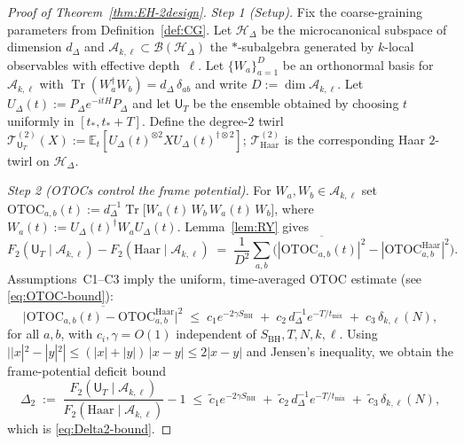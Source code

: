 \documentclass[a4paper,11pt]{article}
\newcommand{\Tr}{\operatorname{Tr}}
\theoremstyle{plain}
\theoremstyle{definition}
\theoremstyle{remark}
\begin{document}
\begin{proof}[Proof of Theorem~\ref{thm:EH-2design}]
\emph{Step 1 (Setup).} Fix the coarse-graining parameters from Definition~\ref{def:CG}. Let $\mathcal{H}_\Delta$
be the microcanonical subspace of dimension $d_\Delta$ and $\mathscr{A}_{k,\ell}\subset\mathcal{B}(\mathcal{H}_\Delta)$ the
$*$-subalgebra generated by $k$-local observables with effective depth~$\ell$. Let $\{W_a\}_{a=1}^{D}$ be an orthonormal basis
for $\mathscr{A}_{k,\ell}$ with $\Tr(W_a^\dagger W_b)=d_\Delta\,\delta_{ab}$ and write $D:=\dim\mathscr{A}_{k,\ell}$.
Let $U_\Delta(t):=P_\Delta e^{-itH}P_\Delta$ and let $\mathsf{U}_T$ be the ensemble obtained by choosing $t$ uniformly
in $[t_\ast,t_\ast+T]$. Define the degree-$2$ twirl
$\mathcal{T}^{(2)}_{\mathsf{U}_T}(X):=\mathbb{E}_{t}\!\left[U_\Delta(t)^{\otimes2} X U_\Delta(t)^{\dagger\otimes2}\right]$;
$\mathcal{T}^{(2)}_{\mathrm{Haar}}$ is the corresponding Haar $2$-twirl on $\mathcal{H}_\Delta$.

\emph{Step 2 (OTOCs control the frame potential).} For $W_a,W_b\in\mathscr{A}_{k,\ell}$ set
$\mathrm{OTOC}_{a,b}(t):=d_\Delta^{-1}\Tr\!\big[W_a(t)\,W_b\,W_a(t)\,W_b\big]$, where $W_a(t):=U_\Delta(t)^\dagger W_a U_\Delta(t)$.
Lemma~\ref{lem:RY} gives
\begin{equation*}
  F_2(\mathsf{U}_T \!\mid\! \mathscr{A}_{k,\ell})-F_2(\mathrm{Haar}\!\mid\!\mathscr{A}_{k,\ell})
  \;=\; \frac{1}{D^2}\sum_{a,b}\Big(\overline{|\mathrm{OTOC}_{a,b}(t)|^2}-|\mathrm{OTOC}^{\mathrm{Haar}}_{a,b}|^2\Big).
\end{equation*}
Assumptions~C1--C3 imply the uniform, time-averaged OTOC estimate (see \eqref{eq:OTOC-bound}):
\begin{equation*}
 \overline{\big|\mathrm{OTOC}_{a,b}(t)-\mathrm{OTOC}^{\mathrm{Haar}}_{a,b}\big|^2}
 \;\le\; c_1 e^{-2\gamma S_{\mathrm{BH}}} \;+\; c_2\, d_\Delta^{-1} e^{-T/t_{\mathrm{mix}}} \;+\; c_3\, \delta_{k,\ell}(N),
\end{equation*}
for all $a,b$, with $c_i,\gamma=O(1)$ independent of $S_{\mathrm{BH}},T,N,k,\ell$. Using $||x|^2-|y|^2|\le(|x|+|y|)\,|x-y|\le 2|x-y|$
and Jensen's inequality, we obtain the frame-potential deficit bound
\begin{equation*}
 \Delta_2 \;:=\; \frac{F_2(\mathsf{U}_T \!\mid\! \mathscr{A}_{k,\ell})}{F_2(\mathrm{Haar}\!\mid\!\mathscr{A}_{k,\ell})}-1
 \;\le\; \tilde c_1 e^{-2\gamma S_{\mathrm{BH}}} \;+\; \tilde c_2\, d_\Delta^{-1} e^{-T/t_{\mathrm{mix}}} \;+\; \tilde c_3\, \delta_{k,\ell}(N),
\end{equation*}
which is \eqref{eq:Delta2-bound}.


\end{proof}
\end{document}
